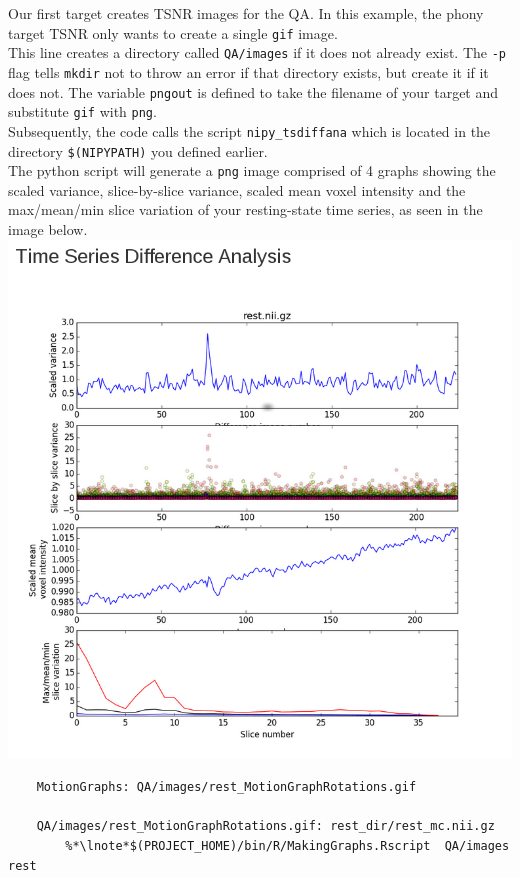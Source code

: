 \noindent{} Our first target creates TSNR images for the QA. In this example, the phony target TSNR only wants \maken{} to create a single \texttt{gif} image. \\
 This line creates a directory called \texttt{QA/images} if it does not already exist. The \texttt{-p} flag tells \texttt{mkdir} not to throw an error if that directory exists, but create it if it does not.
 The variable \texttt{pngout} is defined to take the filename of your target and substitute \texttt{gif} with \texttt{png}.\\
 Subsequently, the code calls the script \texttt{nipy\_tsdiffana} which is located in the directory \texttt{\$(NIPYPATH)} you defined earlier.\\ The python script will generate a \texttt{png} image comprised of 4 graphs showing the scaled variance, slice-by-slice variance, scaled mean voxel intensity and the max/mean/min slice variation of your resting-state time series, as seen in the image below. \\

\includegraphics[scale=0.5]{../images/QAtsdiffana.png}

\begin{lstlisting}
	MotionGraphs: QA/images/rest_MotionGraphRotations.gif 

	QA/images/rest_MotionGraphRotations.gif: rest_dir/rest_mc.nii.gz
		%*\lnote*$(PROJECT_HOME)/bin/R/MakingGraphs.Rscript  QA/images rest
\end{lstlisting}

